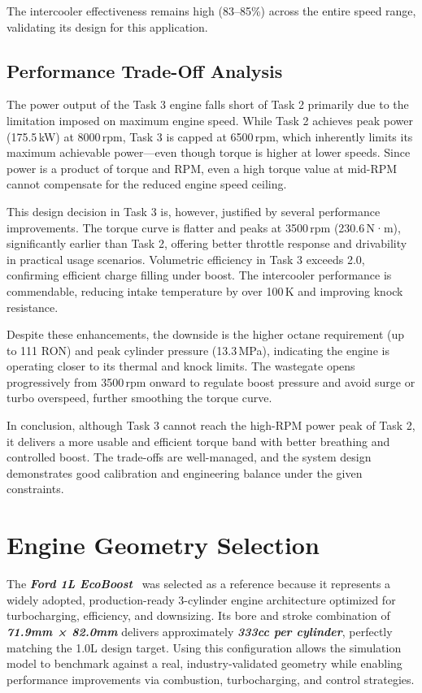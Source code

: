 The intercooler effectiveness remains high (83--85\%) across the entire speed range, validating its design for this application.

\subsection{Performance Trade-Off Analysis}
The power output of the Task 3 engine falls short of Task 2 primarily due to the limitation imposed on maximum engine speed. While Task 2 achieves peak power (175.5\,kW) at 8000\,rpm, Task 3 is capped at 6500\,rpm, which inherently limits its maximum achievable power—even though torque is higher at lower speeds. Since power is a product of torque and RPM, even a high torque value at mid-RPM cannot compensate for the reduced engine speed ceiling.

This design decision in Task 3 is, however, justified by several performance improvements. The torque curve is flatter and peaks at 3500\,rpm (230.6\,N·m), significantly earlier than Task 2, offering better throttle response and drivability in practical usage scenarios. Volumetric efficiency in Task 3 exceeds 2.0, confirming efficient charge filling under boost. The intercooler performance is commendable, reducing intake temperature by over 100\,K and improving knock resistance.

Despite these enhancements, the downside is the higher octane requirement (up to 111 RON) and peak cylinder pressure (13.3\,MPa), indicating the engine is operating closer to its thermal and knock limits. The wastegate opens progressively from 3500\,rpm onward to regulate boost pressure and avoid surge or turbo overspeed, further smoothing the torque curve.

In conclusion, although Task 3 cannot reach the high-RPM power peak of Task 2, it delivers a more usable and efficient torque band with better breathing and controlled boost. The trade-offs are well-managed, and the system design demonstrates good calibration and engineering balance under the given constraints.

\section{Engine Geometry Selection}

The \textbf{\textit{Ford 1L EcoBoost}}~\cite{ford_ecoboost} was selected as a reference because it represents a widely adopted, production-ready 3-cylinder engine architecture optimized for turbocharging, efficiency, and downsizing. Its bore and stroke combination of \textbf{\textit{71.9mm × 82.0mm}} delivers approximately \textbf{\textit{333cc per cylinder}}, perfectly matching the 1.0L design target. Using this configuration allows the simulation model to benchmark against a real, industry-validated geometry while enabling performance improvements via combustion, turbocharging, and control strategies.

